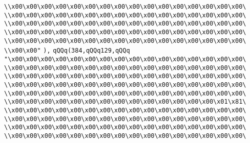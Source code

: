 \verb|\\x00\x00\x00\x00\x00\x00\x00\x00\x00\x00\x00\x00\x00\x00\x00\x00\|\newline
\verb|\\x00\x00\x00\x00\x00\x00\x00\x00\x00\x00\x00\x00\x00\x00\x00\x00\|\newline
\verb|\\x00\x00\x00\x00\x00\x00\x00\x00\x00\x00\x00\x00\x00\x00\x00\x00\|\newline
\verb|\\x00\x00\x00\x00\x00\x00\x00\x00\x00\x00\x00\x00\x00\x00\x00\x00\|\newline
\verb|\\x00\x00\x00\x00\x00\x00\x00\x00\x00\x00\x00\x00\x00\x00\x00\x00\|\newline
\verb|\\x00\x00"|\newline
\verb|),|\newline
\verb|qQQq(384,qQQq129,qQQq|\newline
\verb|"\x00\x00\x00\x00\x00\x00\x00\x00\x00\x00\x00\x00\x00\x00\x00\x00\|\newline
\verb|\\x00\x00\x00\x00\x00\x00\x00\x00\x00\x00\x00\x00\x00\x00\x00\x00\|\newline
\verb|\\x00\x00\x00\x00\x00\x00\x00\x00\x00\x00\x00\x00\x00\x00\x00\x00\|\newline
\verb|\\x00\x00\x00\x00\x00\x00\x00\x00\x00\x00\x00\x00\x00\x00\x00\x00\|\newline
\verb|\\x00\x00\x00\x00\x00\x00\x00\x00\x00\x00\x00\x00\x00\x00\x00\x00\|\newline
\verb|\\x00\x00\x00\x00\x00\x00\x00\x00\x00\x00\x00\x00\x00\x00\x01\x81\|\newline
\verb|\\x00\x00\x00\x00\x00\x00\x00\x00\x00\x00\x00\x00\x00\x00\x00\x00\|\newline
\verb|\\x00\x00\x00\x00\x00\x00\x00\x00\x00\x00\x00\x00\x00\x00\x00\x00\|\newline
\verb|\\x00\x00\x00\x00\x00\x00\x00\x00\x00\x00\x00\x00\x00\x00\x00\x00\|\newline
\verb|\\x00\x00\x00\x00\x00\x00\x00\x00\x00\x00\x00\x00\x00\x00\x00\x00\|\newline
